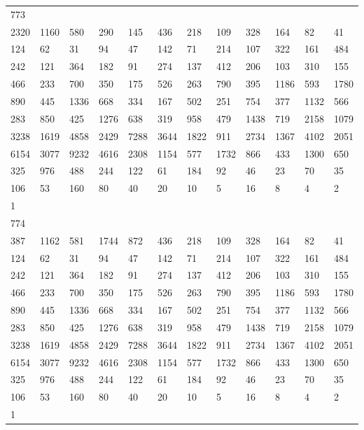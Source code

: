 \begin{longtable}{llllllllllll}
773&&&&&&&&&&&\\
2320& 1160& 580& 290& 145& 436& 218& 109& 328& 164& 82& 41\\
124& 62& 31& 94& 47& 142& 71& 214& 107& 322& 161& 484\\
242& 121& 364& 182& 91& 274& 137& 412& 206& 103& 310& 155\\
466& 233& 700& 350& 175& 526& 263& 790& 395& 1186& 593& 1780\\
890& 445& 1336& 668& 334& 167& 502& 251& 754& 377& 1132& 566\\
283& 850& 425& 1276& 638& 319& 958& 479& 1438& 719& 2158& 1079\\
3238& 1619& 4858& 2429& 7288& 3644& 1822& 911& 2734& 1367& 4102& 2051\\
6154& 3077& 9232& 4616& 2308& 1154& 577& 1732& 866& 433& 1300& 650\\
325& 976& 488& 244& 122& 61& 184& 92& 46& 23& 70& 35\\
106& 53& 160& 80& 40& 20& 10& 5& 16& 8& 4& 2\\
1& \\

774&&&&&&&&&&&\\
387& 1162& 581& 1744& 872& 436& 218& 109& 328& 164& 82& 41\\
124& 62& 31& 94& 47& 142& 71& 214& 107& 322& 161& 484\\
242& 121& 364& 182& 91& 274& 137& 412& 206& 103& 310& 155\\
466& 233& 700& 350& 175& 526& 263& 790& 395& 1186& 593& 1780\\
890& 445& 1336& 668& 334& 167& 502& 251& 754& 377& 1132& 566\\
283& 850& 425& 1276& 638& 319& 958& 479& 1438& 719& 2158& 1079\\
3238& 1619& 4858& 2429& 7288& 3644& 1822& 911& 2734& 1367& 4102& 2051\\
6154& 3077& 9232& 4616& 2308& 1154& 577& 1732& 866& 433& 1300& 650\\
325& 976& 488& 244& 122& 61& 184& 92& 46& 23& 70& 35\\
106& 53& 160& 80& 40& 20& 10& 5& 16& 8& 4& 2\\
1& \\


\end{longtable}
